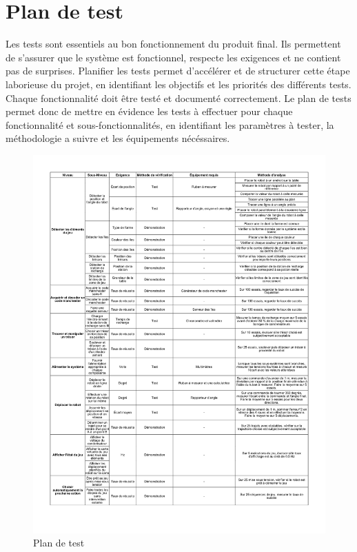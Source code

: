 \chapter{Plan de test}

Les tests sont essentiels au bon fonctionnement du produit final. Ils permettent de s'assurer que le système est fonctionnel, respecte les exigences et ne contient pas de surprises. Planifier les tests permet d'accélérer et de structurer cette étape laborieuse du projet, en identifiant les objectifs et les priorités des différents tests. Chaque fonctionnalité doit être testé et documenté correctement. Le plan de tests permet donc de mettre en évidence les tests à effectuer pour chaque fonctionnalité et sous-fonctionnalités, en identifiant les paramètres à tester, la méthodologie a suivre et les équipements nécéssaires.

\begin{figure}
  \centering
  \includegraphics[scale=0.75, angle=0]{resources/tests.pdf}
  \caption{Plan de test}
\end{figure}

